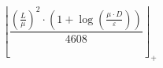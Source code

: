 \[\left\lfloor \frac{\left(\frac{L}{\mu}\right)^{2} \cdot \left(1 + \log\left(\frac{\mu \cdot D}{\varepsilon}\right)\right)}{4608} \right\rfloor_{+}\]

